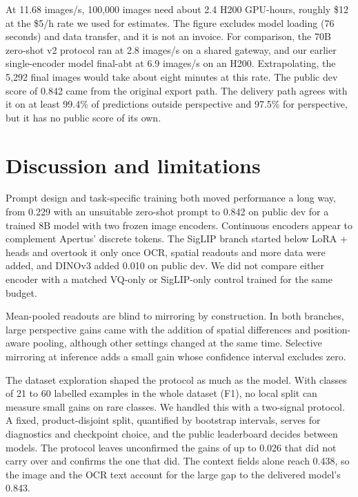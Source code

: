 \documentclass[11pt]{article}
\begin{document}
At 11.68 images/s, 100,000 images need about 2.4 H200 GPU-hours, roughly \$12 at the \$5/h rate we used for estimates. The figure excludes model loading (76 seconds) and data transfer, and it is not an invoice. For comparison, the 70B zero-shot v2 protocol ran at 2.8 images/s on a shared gateway, and our earlier single-encoder model final-abt at 6.9 images/s on an H200. Extrapolating, the 5,292 final images would take about eight minutes at this rate. The public dev score of 0.842 came from the original export path. The delivery path agrees with it on at least 99.4\% of predictions outside perspective and 97.5\% for perspective, but it has no public score of its own.

\section{Discussion and limitations}
Prompt design and task-specific training both moved performance a long way, from 0.229 with an unsuitable zero-shot prompt to 0.842 on public dev for a trained 8B model with two frozen image encoders. Continuous encoders appear to complement Apertus' discrete tokens. The SigLIP branch started below LoRA + heads and overtook it only once OCR, spatial readouts and more data were added, and DINOv3 added 0.010 on public dev. We did not compare either encoder with a matched VQ-only or SigLIP-only control trained for the same budget.

Mean-pooled readouts are blind to mirroring by construction. In both branches, large perspective gains came with the addition of spatial differences and position-aware pooling, although other settings changed at the same time. Selective mirroring at inference adds a small gain whose confidence interval excludes zero.

The dataset exploration shaped the protocol as much as the model. With classes of 21 to 60 labelled examples in the whole dataset (F1), no local split can measure small gains on rare classes. We handled this with a two-signal protocol. A fixed, product-disjoint split, quantified by bootstrap intervals, serves for diagnostics and checkpoint choice, and the public leaderboard decides between models. The protocol leaves unconfirmed the gains of up to 0.026 that did not carry over and confirms the one that did. The context fields alone reach 0.438, so the image and the OCR text account for the large gap to the delivered model's 0.843.
\end{document}
